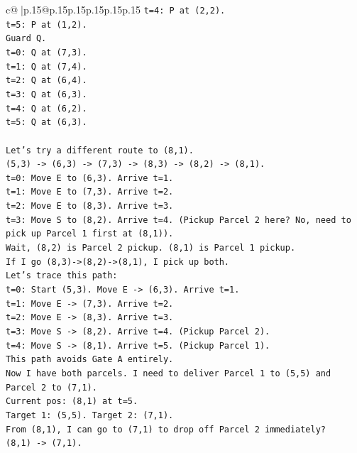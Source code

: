 \documentclass{article}
\begin{document}
{\begin{supertabular}{c@{$\;$}|p{.15\linewidth}@{}p{.15\linewidth}p{.15\linewidth}p{.15\linewidth}p{.15\linewidth}p{.15\linewidth}}
{{{\texttt{t=4: P at (2,2).} \\
\texttt{t=5: P at (1,2).} \\
\texttt{Guard Q.} \\
\texttt{t=0: Q at (7,3).} \\
\texttt{t=1: Q at (7,4).} \\
\texttt{t=2: Q at (6,4).} \\
\texttt{t=3: Q at (6,3).} \\
\texttt{t=4: Q at (6,2).} \\
\texttt{t=5: Q at (6,3).} \\
\\ 
\texttt{Let's try a different route to (8,1).} \\
\texttt{(5,3) {-}> (6,3) {-}> (7,3) {-}> (8,3) {-}> (8,2) {-}> (8,1).} \\
\texttt{t=0: Move E to (6,3). Arrive t=1.} \\
\texttt{t=1: Move E to (7,3). Arrive t=2.} \\
\texttt{t=2: Move E to (8,3). Arrive t=3.} \\
\texttt{t=3: Move S to (8,2). Arrive t=4. (Pickup Parcel 2 here? No, need to pick up Parcel 1 first at (8,1)).} \\
\texttt{Wait, (8,2) is Parcel 2 pickup. (8,1) is Parcel 1 pickup.} \\
\texttt{If I go (8,3){-}>(8,2){-}>(8,1), I pick up both.} \\
\texttt{Let's trace this path:} \\
\texttt{t=0: Start (5,3). Move E {-}> (6,3). Arrive t=1.} \\
\texttt{t=1: Move E {-}> (7,3). Arrive t=2.} \\
\texttt{t=2: Move E {-}> (8,3). Arrive t=3.} \\
\texttt{t=3: Move S {-}> (8,2). Arrive t=4. (Pickup Parcel 2).} \\
\texttt{t=4: Move S {-}> (8,1). Arrive t=5. (Pickup Parcel 1).} \\
\texttt{This path avoids Gate A entirely.} \\
\texttt{Now I have both parcels. I need to deliver Parcel 1 to (5,5) and Parcel 2 to (7,1).} \\
\texttt{Current pos: (8,1) at t=5.} \\
\texttt{Target 1: (5,5). Target 2: (7,1).} \\
\texttt{From (8,1), I can go to (7,1) to drop off Parcel 2 immediately?} \\
\texttt{(8,1) {-}> (7,1).} \\
}}}
\end{supertabular}}
\end{document}
